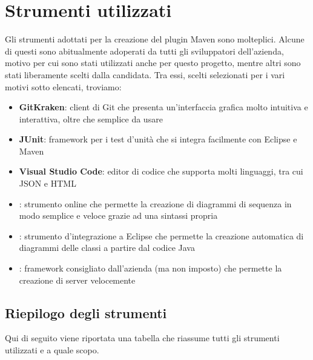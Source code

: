 \section{Strumenti utilizzati}
Gli strumenti adottati per la creazione del plugin Maven sono molteplici.
Alcune di questi sono abitualmente adoperati da tutti gli sviluppatori dell'azienda, motivo per cui sono stati utilizzati anche per questo progetto, mentre altri sono stati liberamente scelti dalla candidata.
Tra essi, scelti selezionati per i vari motivi sotto elencati, troviamo:
\begin{itemize}
    \item \textbf{GitKraken}: client di Git che presenta un'interfaccia grafica molto intuitiva e interattiva, oltre che semplice da usare
    \item \textbf{JUnit}: framework per i test d'unità che si integra facilmente con Eclipse e Maven
    \item \textbf{Visual Studio Code}: editor di codice che supporta molti linguaggi, tra cui JSON e HTML
    \item {}: strumento online che permette la creazione di diagrammi di sequenza in modo semplice e veloce grazie ad una sintassi propria
    \item {}: strumento d'integrazione a Eclipse che permette la creazione automatica di diagrammi delle classi a partire dal codice Java
    \item {}: framework consigliato dall'azienda (ma non imposto) che permette la creazione di server velocemente
\end{itemize}


    \subsection{Riepilogo degli strumenti}

    Qui di seguito viene riportata una tabella che riassume tutti gli strumenti utilizzati e a quale scopo.

